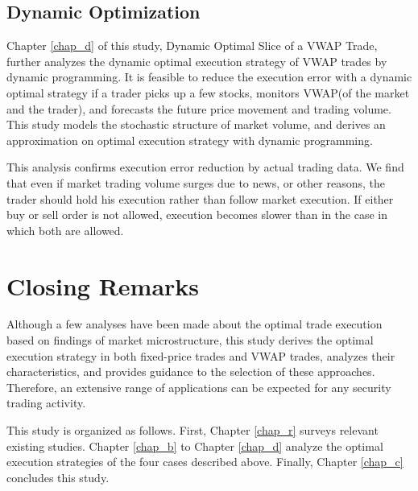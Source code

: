 \subsection{Dynamic Optimization}\label{sec_i22}
Chapter \ref{chap_d} of this study, Dynamic Optimal Slice of a VWAP Trade, further analyzes the dynamic optimal execution strategy of VWAP trades by dynamic programming.  It is feasible to reduce the execution error with a dynamic optimal strategy if a trader picks up a few stocks, monitors VWAP(of the market and the trader), and forecasts the future price movement and trading volume.  This study models the stochastic structure of market volume, and derives an approximation on optimal execution strategy with dynamic programming.  

This analysis confirms execution error reduction by actual trading data.  We find that even if market trading volume surges due to news, or other reasons, the trader should hold his execution rather than follow market execution.  If either buy or sell order is not allowed, execution becomes slower than in the case in which both are allowed.


\bigskip

\section{Closing Remarks}\label{sec_i3}
Although a few analyses have been made about the optimal trade execution based on findings of market microstructure, this study derives the optimal execution strategy in both fixed-price trades and VWAP trades, analyzes their characteristics, and provides guidance to the selection of these approaches.  Therefore, an extensive range of applications can be expected for any security trading activity.

This study is organized as follows.  First, Chapter \ref{chap_r} surveys relevant existing studies.  Chapter \ref{chap_b} to Chapter \ref{chap_d} analyze the optimal execution strategies of the four cases described above.  Finally, Chapter \ref{chap_c} concludes this study.
